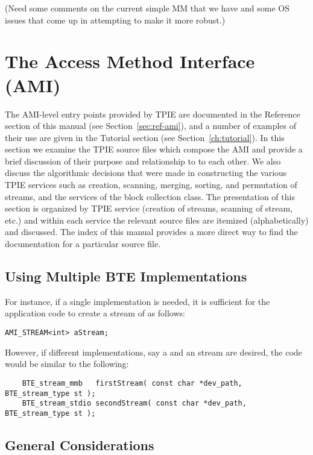 (Need some comments on the current simple MM that we have and some OS issues
that come up in attempting to make it more robust.)



\section{The Access Method Interface (AMI)}

The AMI-level entry points provided by TPIE are documented
in the Reference section of this manual (see
Section~\ref{sec:ref-ami}), and a number of examples of
their use are given in the Tutorial section (see
Section~\ref{ch:tutorial}).  In this section we examine the
TPIE source files which compose the AMI and provide a brief
discussion of their purpose and relationship to to each
other. We also discuss the algorithmic decisions that were
made in constructing the various TPIE services such as
creation, scanning, merging, sorting, and permutation of
streams, and the services of the block collection class. The
presentation of this section is organized by TPIE service
(creation of streams, scanning of stream, etc.) and within
each service the relevant source files are itemized
(alphabetically) and discussed. The index of this manual
provides a more direct way to find the documentation for a
particular source file.

\subsection{Using Multiple BTE Implementations}


For instance, if a single implementation is needed, it is
sufficient for the application code to create a stream of
 as follows:
\begin{verbatim}
AMI_STREAM<int> aStream;
\end{verbatim}
However, if different implementations, say a  and
an  stream are desired, the code would be similar
to the following:
\begin{verbatim}
    BTE_stream_mmb   firstStream( const char *dev_path, BTE_stream_type st );
    BTE_stream_stdio secondStream( const char *dev_path, BTE_stream_type st );

\end{verbatim}

\subsection{General Considerations}

